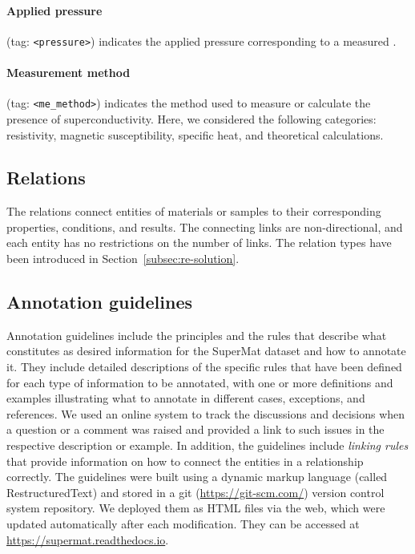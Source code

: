 \paragraph{Applied pressure} (tag: \texttt{<pressure>}) indicates the applied pressure corresponding to a measured \tc. 

\paragraph{Measurement method} (tag: \texttt{<me\_method>}) indicates the method used to measure or calculate the presence of superconductivity. Here, we considered the following categories: resistivity, magnetic susceptibility, specific heat, and theoretical calculations. 


\subsection{Relations}
\label{relations}
The relations connect entities of materials or samples to their corresponding properties, conditions, and results. 
The connecting links are non-directional, and each entity has no restrictions on the number of links. 
The relation types have been introduced in Section~\ref{subsec:re-solution}.


\subsection{Annotation guidelines}
\label{subsec:annotation-guidelines}
Annotation guidelines include the principles and the rules that describe what constitutes as desired information for the SuperMat dataset and how to annotate it. They include detailed descriptions of the specific rules that have been defined for each type of information to be annotated, with one or more definitions and examples illustrating what to annotate in different cases, exceptions, and references. We used an online system to track the discussions and decisions when a question or a comment was raised and provided a link to such issues in the respective description or example. 
In addition, the guidelines include \textit{linking rules} that provide information on how to connect the entities in a relationship correctly. 
The guidelines were built using a dynamic markup language (called RestructuredText) and stored in a git (\url{https://git-scm.com/}) version control system repository. We deployed them as HTML files via the web, which were updated automatically after each modification. They can be accessed at \url{https://supermat.readthedocs.io}.

